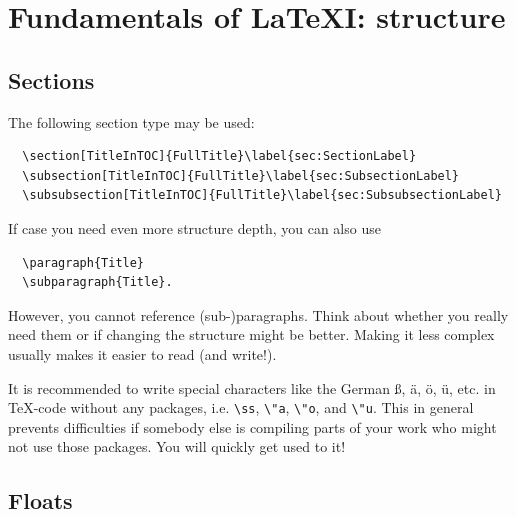 \documentclass[12pt,a4paper]{article}
\makeatletter
\newcommand{\insertblankpage}{\mbox{}\thispagestyle{empty}\addtocounter{page}{-1}\newpage}
\renewcommand{\cleardoublepage}{\clearpage\if@twoside \ifodd\c@page\else
  \hbox{}
  \vspace*{\fill}
  \thispagestyle{empty}
  \newpage
  \if@twocolumn\hbox{}\newpage\fi\fi\fi}
\makeatother
\begin{document}
\cleardoublepage
\section{Fundamentals of \LaTeX I: structure}
\label{sec:struct}

\subsection{Sections}
\label{sec:sec}
The following section type may be used:

\begin{verbatim}
  \section[TitleInTOC]{FullTitle}\label{sec:SectionLabel}
  \subsection[TitleInTOC]{FullTitle}\label{sec:SubsectionLabel}
  \subsubsection[TitleInTOC]{FullTitle}\label{sec:SubsubsectionLabel}
\end{verbatim}
If case you need even more structure depth, you can also use

\begin{verbatim}
  \paragraph{Title}
  \subparagraph{Title}.
\end{verbatim}
However, you cannot reference (sub-)paragraphs. Think about whether you really
need them or if changing the structure might be better. Making it less complex
usually makes it easier to read (and write!).

It is recommended to write special characters like the German \ss, \"a,
\"o, \"u, etc. in \TeX-code without any packages, i.e. \verb!\ss!, \verb!\"a!,
\verb!\"o!, and \verb!\"u!. This in general prevents difficulties if somebody
else is compiling parts of your work who might not use those packages. You
will quickly get used to it!

\subsection{Floats}
\label{sec:float}
\end{document}
